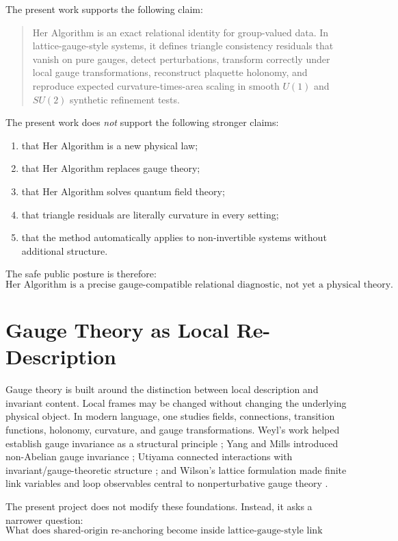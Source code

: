 \documentclass[11pt]{article}
\newcommand{\HA}{Her Algorithm}
\newcommand{\Uone}{U(1)}
\newcommand{\Sutwo}{SU(2)}
\begin{document}
The present work supports the following claim:

\begin{quote}
\HA{} is an exact relational identity for group-valued data.  In lattice-gauge-style systems, it defines triangle consistency residuals that vanish on pure gauges, detect perturbations, transform correctly under local gauge transformations, reconstruct plaquette holonomy, and reproduce expected curvature-times-area scaling in smooth \(\Uone\) and \(\Sutwo\) synthetic refinement tests.
\end{quote}

The present work does \emph{not} support the following stronger claims:
\begin{enumerate}[leftmargin=1.5em]
\item that \HA{} is a new physical law;
\item that \HA{} replaces gauge theory;
\item that \HA{} solves quantum field theory;
\item that triangle residuals are literally curvature in every setting;
\item that the method automatically applies to non-invertible systems without additional structure.
\end{enumerate}

The safe public posture is therefore:
\[
\boxed{\text{\HA{} is a precise gauge-compatible relational diagnostic, not yet a physical theory.}}
\]

\section{Gauge Theory as Local Re-Description}

Gauge theory is built around the distinction between local description and invariant content.  Local frames may be changed without changing the underlying physical object.  In modern language, one studies fields, connections, transition functions, holonomy, curvature, and gauge transformations.  Weyl's work helped establish gauge invariance as a structural principle \cite{weyl1929gravitation}; Yang and Mills introduced non-Abelian gauge invariance \cite{yangmills1954}; Utiyama connected interactions with invariant/gauge-theoretic structure \cite{utiyama1956}; and Wilson's lattice formulation made finite link variables and loop observables central to nonperturbative gauge theory \cite{wilson1974}.

The present project does not modify these foundations.  Instead, it asks a narrower question:
\[
\boxed{\text{What does shared-origin re-anchoring become inside lattice-gauge-style link fields?}}
\]
\end{document}
